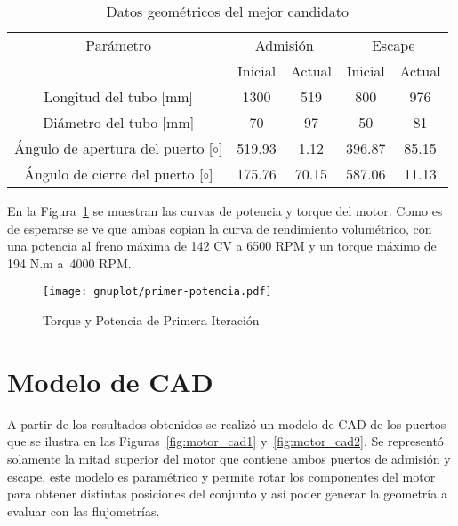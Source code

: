 \begin{table}[h!]
  \centering
  \begin{tabular}{ccccc}
    \toprule
    Parámetro & \multicolumn{2}{c}{Admisión} & \multicolumn{2}{c}{Escape} \\
    \cmidrule(lr){2-3} \cmidrule(lr){4-5}
    & Inicial & Actual & Inicial & Actual \\
    \midrule
    Longitud del tubo [mm] & 1300 & 519 & 800 & 976 \\
    Diámetro del tubo [mm] & 70 & 97 & 50 & 81 \\
    Ángulo de apertura del puerto [$\circ$] & 519.93 & 1.12 & 396.87 & 85.15 \\
    Ángulo de cierre del puerto [$\circ$] & 175.76 & 70.15 & 587.06 & 11.13 \\
    \bottomrule
  \end{tabular}
  \caption{Datos geométricos del mejor candidato}
  \label{tab:resultado_primer_it}
\end{table}


En la Figura~\ref{fig:PoTi_primer_op} se muestran las curvas de potencia y
torque del motor.
%
Como es de esperarse se ve que ambas copian la curva de rendimiento volumétrico,
con una potencia al freno máxima de 142 CV a 6500 RPM y un torque máximo de 194
N.m a\ 4000 RPM.

\begin{figure}[h!]
  \centering
  \texttt{[image: gnuplot/primer-potencia.pdf]}
  \caption{Torque y Potencia de Primera Iteración} \label{fig:PoTi_primer_op}
\end{figure}


\section{Modelo de CAD}
%
A partir de los resultados obtenidos se realizó un modelo de CAD de los puertos
que se ilustra en las Figuras~\ref{fig:motor_cad1} y~\ref{fig:motor_cad2}.
%
Se representó solamente la mitad superior del motor que contiene ambos puertos
de admisión y escape, este modelo es paramétrico y permite rotar los componentes
del motor para obtener distintas posiciones del conjunto y así poder generar la
geometría a evaluar con las flujometrías.


